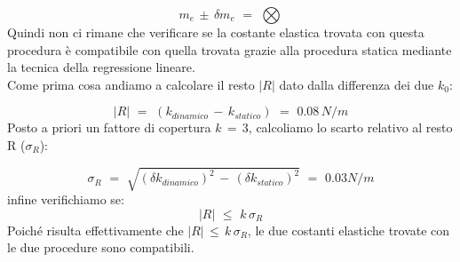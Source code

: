 \begin{equation*}
	m_e \, \pm \, \delta m_e \,\,=\,\, \bigotimes
\end{equation*}
%
Quindi non ci rimane che verificare se la costante elastica trovata con questa procedura è compatibile con quella trovata grazie alla procedura statica mediante la tecnica della regressione lineare.\\
Come prima cosa andiamo a calcolare il resto $|R|$ dato dalla differenza dei due $k_0$:

\begin{equation*}
	|R| \,\,=\,\, (k_{dinamico} \,-\, k_{statico}) \,\,=\,\, 0.08 \, N/m
\end{equation*}
%
Posto a priori un fattore di copertura $k \,=\, 3$, calcoliamo lo scarto relativo al resto R ($\sigma_R$):

\begin{equation*}
	\sigma_R \,\,=\,\, \sqrt{(\delta k_{dinamico})^2 \,-\, (\delta k_{statico})^2} \,\,=\,\, 0.03 N/m	
\end{equation*}
%
infine verifichiamo se:
\begin{equation*}
	|R| \,\,\leq\,\, k \, \sigma_R  
\end{equation*}
%
Poiché risulta effettivamente che $|R| \,\leq\, k\,\sigma_R$, le due costanti elastiche trovate con le due procedure sono compatibili.



